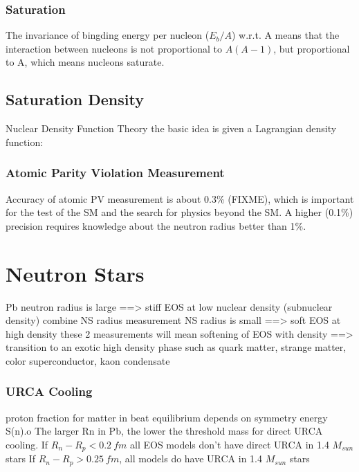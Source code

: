 \subsubsection{Saturation}
The invariance of bingding energy per nucleon ($E_b/A$) w.r.t. A means that
the interaction between nucleons is not proportional to $A(A-1)$, but proportional
to A, which means nucleons saturate.
\subsection{Saturation Density}
Nuclear Density Function Theory
the basic idea is given a Lagrangian density function:

\subsubsection{Atomic Parity Violation Measurement}
Accuracy of atomic PV measurement is about 0.3\% (FIXME), which is important
for the test of the SM and the search for physics beyond the SM. A higher (0.1\%)
precision requires knowledge about the neutron radius better than 1\%. \cite{PhysRevC.46.2587}

\section{Neutron Stars}
Pb neutron radius is large ==> stiff EOS at low nuclear density (subnuclear density)
combine NS radius measurement
NS radius is small ==> soft EOS at high density
these 2 measurements will mean softening of EOS with density ==> transition to
an exotic high density phase such as quark matter, strange matter, color
superconductor, kaon condensate

\subsubsection{URCA Cooling}
proton fraction for matter in beat equilibrium depends on symmetry energy S(n).o
The larger Rn in Pb, the lower the threshold mass for direct URCA cooling.
If $R_n - R_p < 0.2 \ fm$ all EOS models don't have direct URCA in 1.4 $M_{sun}$ stars
If $R_n - R_p > 0.25 \ fm$, all models do have URCA in 1.4 $M_{sun}$ stars
